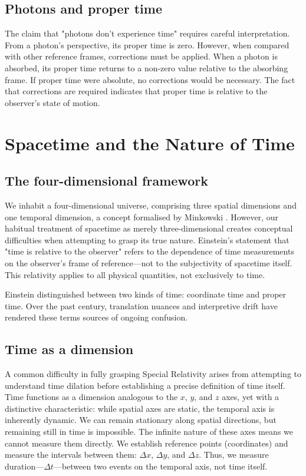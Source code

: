 \documentclass[a4paper,fleqn]{cas-sc}
\begin{document}
	\subsection{Photons and proper time}\label{subsec3_8}
		The claim that "photons don't experience time" requires careful interpretation. From a photon's perspective, its proper time is zero.
However, when compared with other reference frames, corrections must be applied. When a photon is absorbed, its proper time returns to a non-zero value relative to the absorbing frame.
	If proper time were absolute, no corrections would be necessary. The fact that corrections are required indicates that proper time is relative to the observer's state of motion.

\section{Spacetime and the Nature of Time}\label{sec4}
	\subsection{The four-dimensional framework}\label{subsec4_1}
	We inhabit a four-dimensional universe, comprising three spatial dimensions and one temporal dimension, a concept formalised by Minkowski \cite{minkowski1908}. However, our habitual treatment of spacetime as merely three-dimensional creates conceptual difficulties when attempting to grasp its true nature. Einstein's statement that "time is relative to the observer" \cite{einstein1905} refers to the dependence of time measurements on the observer's frame of reference—not to the subjectivity of spacetime itself. This relativity applies to all physical quantities, not exclusively to time.

	Einstein distinguished between two kinds of time: coordinate time and proper time. Over the past century, translation nuances and interpretive drift have rendered these terms sources of ongoing confusion.
	\subsection{Time as a dimension}\label{subsec4_2}
	A common difficulty in fully grasping Special Relativity arises from attempting to understand time dilation before establishing a precise definition of time itself. 
	Time functions as a dimension analogous to the $x$, $y$, and $z$ axes, yet with a distinctive characteristic: while spatial axes are static, the temporal axis is inherently dynamic. We can remain stationary along spatial directions, but remaining still in time is impossible.
	The infinite nature of these axes means we cannot measure them directly. We establish reference points (coordinates) and measure the intervals between them: $\Delta x$, $\Delta y$, and $\Delta z$. Thus, we measure duration—$\Delta t$—between two events on the temporal axis, not time itself.
\end{document}
